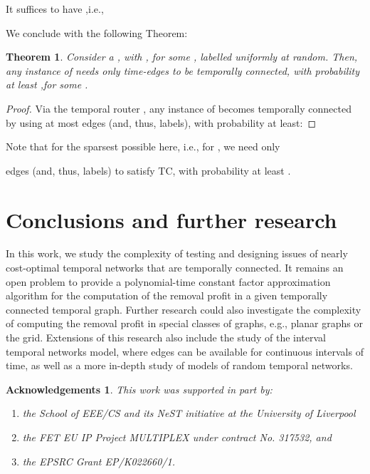 \documentclass[a4paper,UKenglish]{article}
\newtheorem{theorem}{Theorem}
\newtheorem*{acknowledgements*}{Acknowledgements}
\begin{document}
It suffices to have ,i.e., 

We conclude with the following Theorem:
\begin{theorem}
Consider a , with , for some , labelled uniformly at random. Then, any instance  of  needs only  time-edges to be temporally connected, with probability at least ,for some .
\end{theorem}
\begin{proof}
Via the temporal router , any instance  of  becomes temporally connected by using at most  edges (and, thus, labels), with probability at least:

\end{proof}

Note that for the sparsest possible  here, i.e., for , we need only 

 edges (and, thus, labels) to satisfy TC, with probability at least .


\section{Conclusions and further research}
In this work, we study the complexity of testing and designing issues of nearly cost-optimal temporal networks that are temporally connected. It remains an open problem to provide a polynomial-time constant factor approximation algorithm for the computation of the removal profit in a given temporally connected temporal graph. Further research could also investigate the complexity of computing the removal profit in special classes of graphs, e.g., planar graphs or the grid. Extensions of this research also include the study of the interval temporal networks model, where edges can be available for continuous intervals of time, as well as a more in-depth study of models of random temporal networks.


\begin{acknowledgements*}


This work was supported in part by:
\begin{enumerate}[label=(i)]
\item the School of EEE/CS and its NeST initiative at the University of Liverpool
\item the FET EU IP Project MULTIPLEX under contract No. 317532, and
\item the EPSRC Grant EP/K022660/1.
\end{enumerate}
\end{acknowledgements*}




  
\end{document}
